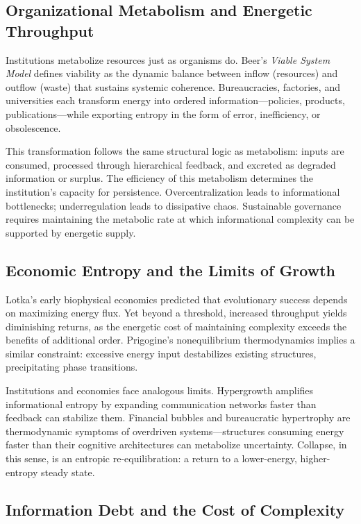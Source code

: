 \documentclass[11pt,a4paper]{article}
\begin{document}
\subsection{Organizational Metabolism and Energetic Throughput}

Institutions metabolize resources just as organisms do.  Beer’s \emph{Viable System Model} \citep{Beer1979BrainOfFirm} defines viability as the dynamic balance between inflow (resources) and outflow (waste) that sustains systemic coherence.  Bureaucracies, factories, and universities each transform energy into ordered information—policies, products, publications—while exporting entropy in the form of error, inefficiency, or obsolescence.

This transformation follows the same structural logic as metabolism: inputs are consumed, processed through hierarchical feedback, and excreted as degraded information or surplus.  The efficiency of this metabolism determines the institution’s capacity for persistence.  Overcentralization leads to informational bottlenecks; underregulation leads to dissipative chaos.  Sustainable governance requires maintaining the metabolic rate at which informational complexity can be supported by energetic supply.

\subsection{Economic Entropy and the Limits of Growth}

Lotka’s early biophysical economics \citep{Lotka1922PhysicalBiology} predicted that evolutionary success depends on maximizing energy flux.  Yet beyond a threshold, increased throughput yields diminishing returns, as the energetic cost of maintaining complexity exceeds the benefits of additional order.  Prigogine’s nonequilibrium thermodynamics implies a similar constraint: excessive energy input destabilizes existing structures, precipitating phase transitions.

Institutions and economies face analogous limits.  Hypergrowth amplifies informational entropy by expanding communication networks faster than feedback can stabilize them.  Financial bubbles and bureaucratic hypertrophy are thermodynamic symptoms of overdriven systems—structures consuming energy faster than their cognitive architectures can metabolize uncertainty.  Collapse, in this sense, is an entropic re-equilibration: a return to a lower-energy, higher-entropy steady state.

\subsection{Information Debt and the Cost of Complexity}
\end{document}
